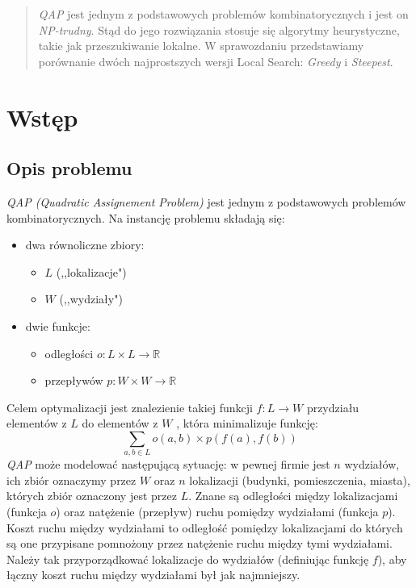 \documentclass{article}
\begin{document}


\begin{abstract}
\emph{QAP} jest jednym z podstawowych problemów kombinatorycznych i jest on \emph{NP-trudny}. Stąd do jego rozwiązania stosuje się algorytmy heurystyczne, takie jak przeszukiwanie lokalne. W sprawozdaniu przedstawiamy porównanie dwóch najprostszych wersji Local Search: \emph{Greedy} i \emph{Steepest}.
\end{abstract}


\section{Wstęp}
	\subsection{Opis problemu}
	\emph{\emph{QAP} (Quadratic Assignement Problem)} jest jednym z podstawowych problemów kombinatorycznych. Na instancję problemu składają się:
	\begin{itemize}
		\item{dwa równoliczne zbiory:
			\begin{itemize}
				\item{ $L$ (,,lokalizacje")}
				\item{ $W$ (,,wydziały") }
			\end{itemize}
			}
		\item{dwie funkcje:
			\begin{itemize}
				\item{ odległości $o:  L \times L \rightarrow \mathbb{R} $}
				\item{ przepływów $p: W \times W \rightarrow \mathbb{R} $}
			\end{itemize}}
	\end{itemize}
		Celem optymalizacji jest znalezienie takiej funkcji $ f: L \rightarrow W $  przydziału elementów z $L$ do elementów z $W$ , która minimalizuje funkcję:
	$$\sum_{a,b \in L}o(a,b)\times p(f(a),f(b))$$
	\emph{QAP} może modelować następującą sytuację: w pewnej firmie jest $n$ wydziałów, ich zbiór oznaczymy przez $W$ oraz $n$ lokalizacji (budynki, pomieszczenia, miasta), których zbiór oznaczony jest przez $L$. Znane są odległości między lokalizacjami (funkcja $o$) oraz natężenie (przepływ) ruchu pomiędzy wydziałami (funkcja $p$). Koszt ruchu między wydziałami to odległość pomiędzy lokalizacjami do których są one przypisane pomnożony przez natężenie ruchu między tymi wydziałami. Należy tak przyporządkować lokalizacje do wydziałów (definiując funkcję $f$), aby łączny koszt ruchu między wydziałami był jak najmniejszy.
\end{document}
